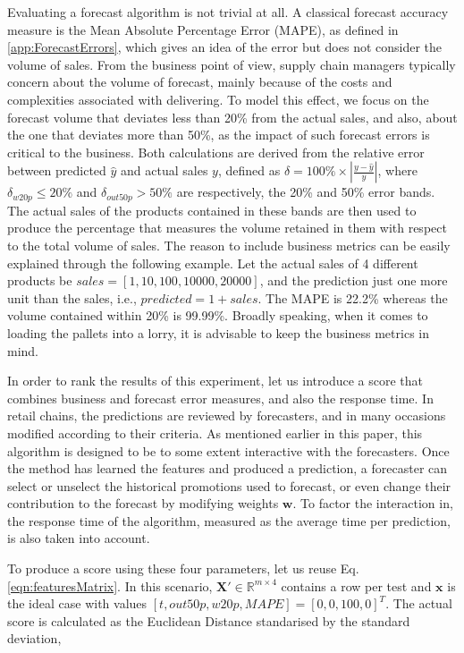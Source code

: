 \documentclass{ieeeaccess}
\begin{document}
Evaluating a forecast algorithm is not trivial at all. A classical forecast accuracy measure is the Mean Absolute Percentage Error (MAPE), as defined in \ref{app:ForecastErrors}, which gives an idea of the error but does not consider the volume of sales. From the business point of view, supply chain managers typically concern about the volume of forecast, mainly because of the costs and complexities associated with delivering. To model this effect, we focus on the forecast volume that deviates less than 20\% from the actual sales, and also, about the one that deviates more than 50\%, as the impact of such forecast errors is critical to the business. Both calculations are derived from the relative error between predicted $\hat{y}$ and actual sales $y$, defined as $\delta = 100\%\times \left|{\frac {y-\hat{y}}{y}}\right|$, where $\delta_{w20p} \leq 20\% $ and $\delta_{out50p} > 50\%$ are respectively, the 20\% and 50\% error bands. The actual sales of the  products contained in these bands are then used to produce the percentage that measures the volume retained in them with respect to the total volume of sales. The reason to include business metrics can be easily explained through the following example. Let the actual sales of 4 different products be $sales = \left[1, 10, 100, 10000, 20000\right]$, and the prediction just one more unit than the sales, i.e., $predicted = 1 + sales$. The MAPE is 22.2\% whereas the volume contained within 20\% is 99.99\%. Broadly speaking, when it comes to loading the pallets into a lorry, it is advisable to keep the business metrics in mind.

In order to rank the results of this experiment, let us introduce a score that combines business and forecast error measures, and also the response time. In retail chains, the predictions are reviewed by forecasters, and in many occasions modified according to their criteria. As mentioned earlier in this paper, this algorithm is designed to be to some extent interactive with the forecasters. Once the method has learned the features and produced a prediction, a forecaster can select or unselect the historical promotions used to forecast, or even change their contribution to the forecast by modifying weights $\mathbf{w}$. To factor the interaction in, the response time of the algorithm, measured as the average time per prediction, is also taken into account.

To produce a score using these four parameters, let us reuse Eq.\eqref{eqn:featuresMatrix}. In this scenario, $\mathbf{X'} \in \mathbb{R}^{m \times 4}$ contains a row per test and $\mathbf{x}$ is the ideal case with values $[t,out50p,w20p, MAPE] =[0,0,100,0]^T$. The actual score is calculated as the Euclidean Distance standarised by the standard deviation,
\end{document}
